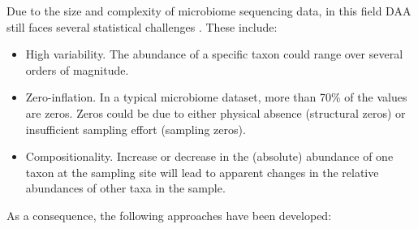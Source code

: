 \documentclass[
]{book}
\begin{document}
Due to the size and complexity of microbiome sequencing data, in this field
DAA still faces several statistical challenges \citep{Yang2022}. These include:

\begin{itemize}
\item
  High variability. The abundance of a specific taxon could range over
  several orders of magnitude.
\item
  Zero-inflation. In a typical microbiome dataset, more than 70\% of the
  values are zeros. Zeros could be due to either physical absence
  (structural zeros) or insufficient sampling effort (sampling zeros).
\item
  Compositionality. Increase or decrease in the (absolute) abundance of
  one taxon at the sampling site will lead to apparent changes in the
  relative abundances of other taxa in the sample.
\end{itemize}

As a consequence, the following approaches have been developed:
\end{document}

